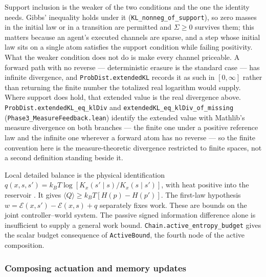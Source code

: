\documentclass{article}
\renewcommand{\cite}[1]{\citep{#1}}
\begin{document}
Support inclusion is the weaker of the two conditions and the one the identity
needs. Gibbs' inequality holds under it (\nolinkurl{KL_nonneg_of_support}),
so zero masses in the initial law or in a transition are permitted and $\Sigma\ge0$
survives them; this matters because an agent's executed channels are sparse, and
a step whose initial law sits on a single atom satisfies the support condition
while failing positivity. What the weaker condition does not do is make every
channel priceable. A forward path with no reverse --- deterministic erasure is
the standard case --- has infinite divergence, and
\texttt{ProbDist.extendedKL} records it as such in $[0,\infty]$ rather than
returning the finite number the totalized real logarithm would supply. Where
support does hold, that extended value is the real divergence above.
\nolinkurl{ProbDist.extendedKL_eq_klDiv} and
\nolinkurl{extendedKL_eq_klDiv_of_missing}
(\nolinkurl{Phase3_MeasureFeedback.lean}) identify the extended value
with Mathlib's measure divergence on both branches --- the finite one under a
positive reference law and the infinite one wherever a forward atom has no
reverse --- so the finite convention here is the measure-theoretic divergence
restricted to finite spaces, not a second definition standing beside it.

Local detailed balance is the physical identification
$q(x,s,s')=k_BT\log[K_x(s'\mid s)/K_x(s\mid s')]$, with heat positive into the reservoir \cite{horowitz2014,ito2013}. It gives
$\langle Q\rangle\ge k_BT[H(p)-H(p')]$.
The first-law hypothesis $w=\mathcal{E}(x,s')-\mathcal{E}(x,s)+q$ separately fixes work. These are bounds on the joint controller--world system. The passive signed information difference alone is insufficient to supply a general work bound. \nolinkurl{Chain.active_entropy_budget} gives the scalar budget consequence of \texttt{ActiveBound}, the fourth node of the active composition.

\subsubsection{Composing actuation and memory updates}
\label{sec:supp-cycle}
\end{document}
